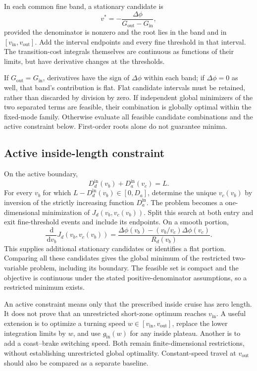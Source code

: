 \documentclass[conference,a4paper]{IEEEtran}
\newcommand{\dd}{\,\mathrm{d}}
\newcommand{\out}{\mathrm{out}}
\newcommand{\inn}{\mathrm{in}}
\begin{document}
In each common fine band, a stationary candidate is
\begin{equation}
v^*=-\frac{\Delta\phi}{G_{\out}-G_{\inn}},
\end{equation}
provided the denominator is nonzero and the root lies in the band and in $[v_{\inn},v_{\out}]$. Add the interval endpoints and every fine threshold in that interval. The transition-cost integrals themselves are continuous as functions of their limits, but have derivative changes at the thresholds.

If $G_{\out}=G_{\inn}$, derivatives have the sign of $\Delta\phi$ within each band; if $\Delta\phi=0$ as well, that band's contribution is flat. Flat candidate intervals must be retained, rather than discarded by division by zero. If independent global minimizers of the two separated terms are feasible, their combination is globally optimal within the fixed-mode family. Otherwise evaluate all feasible candidate combinations and the active constraint below. First-order roots alone do not guarantee minima.

\subsection{Active inside-length constraint}
On the active boundary,
\begin{equation}
D_d^{\inn}(v_b)+D_a^{\inn}(v_c)=L.
\end{equation}
For every $v_b$ for which $L-D_d^{\inn}(v_b)\in[0,D_a]$, determine the unique $v_c(v_b)$ by inversion of the strictly increasing function $D_a^{\inn}$. The problem becomes a one-dimensional minimization of $J_d(v_b,v_c(v_b))$. Split this search at both entry and exit fine-threshold events and include its endpoints. On a smooth portion,
\begin{equation}
\frac{\dd}{\dd v_b}J_d(v_b,v_c(v_b))
=\frac{\Delta\phi(v_b)-(v_b/v_c)\Delta\phi(v_c)}{R_d(v_b)}.
\label{eq:activeDerivative}
\end{equation}
This supplies additional stationary candidates or identifies a flat portion. Comparing all these candidates gives the global minimum of the restricted two-variable problem, including its boundary. The feasible set is compact and the objective is continuous under the stated positive-denominator assumptions, so a restricted minimum exists.

An active constraint means only that the prescribed inside cruise has zero length. It does not prove that an unrestricted short-zone optimum reaches $v_{\inn}$. A useful extension is to optimize a turning speed $w\in[v_{\inn},v_{\out}]$, replace the lower integration limits by $w$, and use $g_{\inn}(w)$ for any inside plateau. Another is to add a coast--brake switching speed. Both remain finite-dimensional restrictions, without establishing unrestricted global optimality. Constant-speed travel at $v_{\out}$ should also be compared as a separate baseline.
\end{document}
